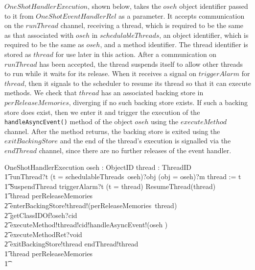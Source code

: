 $OneShotHandlerExecution$, shown below, takes the $oseh$ object
identifier passed to it from $OneShotEventHandlerRel$ as a parameter.
It accepts communication on the $runThread$ channel, receiving a
thread, which is required to be the same as that associated with
$oseh$ in $schedulableThreads$, an object identifier, which is
required to be the same as $oseh$, and a method identifier.
The thread identifier is stored as $thread$ for use later in this
action.
After a communication on $runThread$ has been accepted, the thread
suspends itself to allow other threads to run while it waits for its
release.
When it receives a signal on $triggerAlarm$ for $thread$, then it
signals to the scheduler to resume its thread so that it can execute
methods.
We check that $thread$ has an associated backing store in
$perReleaseMemories$, diverging if no such backing store exists. 
If such a backing store does exist, then we enter it and trigger the
execution of the \texttt{handleAsyncEvent()} method of the object
$oseh$ using the $executeMethod$ channel.
After the method returns, the backing store is exited using the
$exitBackingStore$ and the end of the thread's execution is signalled
via the $endThread$ channel, since there are no further releases of
the event handler. 
\begin{circusaction}
  OneShotHandlerExecution \circdef \circval oseh : ObjectID \circspot \circvar thread : ThreadID \circspot \\
  \t1 runThread?t \prefixcolon (t = schedulableThreads~oseh)?obj \prefixcolon (obj = oseh)?m \then thread := t \circseq \\
  \t1 SuspendThread \circseq triggerAlarm?t \prefixcolon (t = thread) \then ResumeThread(thread) \circseq \\
  \t1 \circif thread \in \dom perReleaseMemories \circthen {} \\
  \t2 enterBackingStore!thread!(perReleaseMemories~thread) \\
  \t2 {} \then getClassIDOf!oseh?cid \\
  \t2 {} \then executeMethod!thread!cid!handleAsyncEvent!(\langle oseh \rangle) \\
  \t2 {} \then executeMethodRet?void \\
  \t2 {} \then exitBackingStore!thread \then endThread!thread \then \Skip \\
  \t1 {} \circelse thread \notin \dom perReleaseMemories \circthen \Chaos \\
  \t1 \circfi
\end{circusaction}

